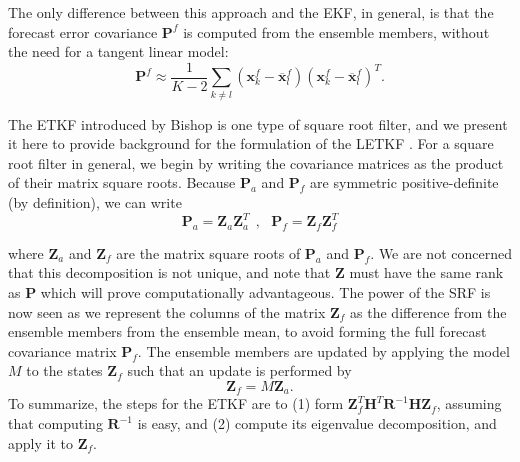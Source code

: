 \documentclass[10pt,letterpaper]{article}
\newcommand{\mbx}{\mathbf{x}}
\newcommand{\mbR}{\mathbf{R}}
\newcommand{\mbH}{\mathbf{H}}
\newcommand{\mbP}{\mathbf{P}}
\newcommand{\mbZ}{\mathbf{Z}}
\begin{document}
The only difference between this approach and the EKF, in general, is that the forecast error covariance $\mbP^f$ is computed from the ensemble members, without the need for a tangent linear model:
\[ \mbP^f \approx \frac{1}{K-2} \sum _{k\neq l} \left ( \mbx_k ^f - \overline{\mbx} ^f _l \right ) \left (\mbx_k ^f - \overline{\mbx} ^f _l \right ) ^T .\]

The ETKF introduced by Bishop is one type of square root filter, and we present it here to provide background for the formulation of the LETKF \cite{bishop2001adaptive}.
For a square root filter in general, we begin by writing the covariance matrices as the product of their matrix square roots.
Because $\mbP_a$ and $\mbP_f$ are symmetric positive-definite (by definition), we can write
\begin{equation} \mbP_a = \mbZ_a \mbZ_a^T ~~,~~~ \mbP_f = \mbZ_f \mbZ_f^T \end{equation}

where $\mbZ_a$ and $\mbZ_f$ are the matrix square roots of $\mbP_a$ and $\mbP_f$.
We are not concerned that this decomposition is not unique, and note that $\mbZ$ must have the same rank as $\mbP$ which will prove computationally advantageous.
The power of the SRF is now seen as we represent the columns of the matrix $\mbZ_f$ as the difference from the ensemble members from the ensemble mean, to avoid forming the full forecast covariance matrix $\mbP_f$.
The ensemble members are updated by applying the model $M$ to the states $\mbZ_f$ such that an update is performed by
\begin{equation} \mbZ_f = M \mbZ_a .\end{equation}
To summarize, the steps for the ETKF are to (1) form $\mbZ_f^T\mbH^T\mbR^{-1}\mbH\mbZ_f$, assuming that computing $\mathbf{R}^{-1}$ is easy, and (2) compute its eigenvalue decomposition, and apply it to $\mbZ_f$.
\end{document}
